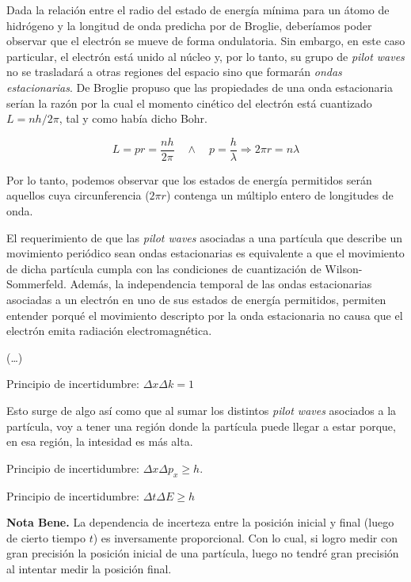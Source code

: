 \documentclass{article}
\begin{document}
Dada la relación entre el radio del estado de energía mínima para un átomo de hidrógeno y la longitud de onda predicha por de Broglie, deberíamos poder observar que el electrón se mueve de forma ondulatoria. Sin embargo, en este caso particular, el electrón está unido al núcleo y, por lo tanto, su grupo de \emph{pilot waves} no se trasladará a otras regiones del espacio sino que formarán \emph{ondas estacionarias}. De Broglie propuso que las propiedades de una onda estacionaria serían la razón por la cual el momento cinético del electrón está cuantizado $L=nh/2\pi$, tal y como había dicho Bohr.

\[ L=pr=\frac{nh}{2\pi} \quad \wedge \quad p=\frac{h}{\lambda} \Longrightarrow 2\pi r=n \lambda \]

Por lo tanto, podemos observar que los estados de energía permitidos serán aquellos cuya circunferencia ($2\pi r$) contenga un múltiplo entero de longitudes de onda.

El requerimiento de que las \emph{pilot waves} asociadas a una partícula que describe un movimiento periódico sean ondas estacionarias es equivalente a que el movimiento de dicha partícula cumpla con las condiciones de cuantización de Wilson-Sommerfeld. Además, la independencia temporal de las ondas estacionarias asociadas a un electrón en uno de sus estados de energía permitidos, permiten entender porqué el movimiento descripto por la onda estacionaria no causa que el electrón emita radiación electromagnética.

(\ldots)

Principio de incertidumbre: $\Delta x \Delta k = 1$

Esto surge de algo así como que al sumar los distintos \emph{pilot waves} asociados a la partícula, voy a tener una región donde la partícula puede llegar a estar porque, en esa región, la intesidad es más alta.

Principio de incertidumbre: $\Delta x \Delta p_{x} \geq h$.

Principio de incertidumbre: $ \Delta t \Delta E \geq h$

\textbf{Nota Bene.} La dependencia de incerteza entre la posición inicial y final (luego de cierto tiempo $t$) es inversamente proporcional. Con lo cual, si logro medir con gran precisión la posición inicial de una partícula, luego no tendré gran precisión al intentar medir la posición final.
\end{document}
